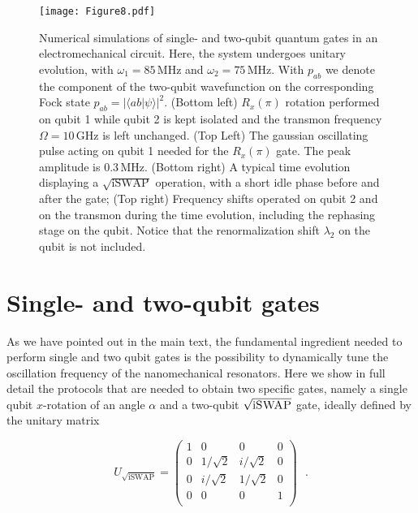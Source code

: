 \documentclass[aps,twocolumn,groupedaddress,superscriptaddress,floatfix,amsmath,amssymb,prb]{revtex4-1}
\begin{document}
\begin{figure*}[t]
\centering
\texttt{[image: Figure8.pdf]} 
\caption{Numerical simulations of single- and two-qubit quantum gates in an electromechanical circuit. Here, the system undergoes unitary evolution, with $\omega_1 = 85\,$MHz and $\omega_2 = 75\,$MHz. With $p_{ab}$ we denote the component of the two-qubit wavefunction on the corresponding Fock state $p_{ab}=\left|\langle ab|\psi\rangle\right|^2$. (Bottom left) $R_x(\pi)$ rotation performed on qubit 1 while qubit 2 is kept isolated and the transmon frequency $\Omega = 10\,$GHz is left unchanged. (Top Left) The gaussian oscillating pulse acting on qubit 1 needed for the $R_x(\pi)$ gate. The peak amplitude is $0.3\,$MHz. (Bottom right) A typical time evolution displaying a $\sqrt{\text{iSWAP}}$ operation, with a short idle phase before and after the gate; (Top right) Frequency shifts operated on qubit 2 and on the transmon during the time evolution, including the rephasing stage on the qubit. Notice that the renormalization shift $\lambda_2$ on the qubit is not included.}
\label{fig:Gates}
\end{figure*}


\section{Single- and two-qubit gates}
\label{app:Gates}

As we have pointed out in the main text, the fundamental ingredient needed to perform single and two qubit gates is the possibility to dynamically tune the oscillation frequency of the nanomechanical resonators. Here we show in full detail the protocols that are needed to obtain two specific gates, namely a single qubit $x$-rotation of an angle $\alpha$ and a two-qubit $\sqrt{\text{i\textsc{SWAP}}}$ gate, ideally defined by the unitary matrix

\begin{equation} \label{iswap_gate}
U_{\sqrt{\mathrm{iSWAP}}} = 
\left(\begin{array}{cccc} 1 & 0  &  0  &  0 \\ 
                                      0 & 1/\sqrt{2} & i/\sqrt{2}   & 0 \\  
                                      0 & i/\sqrt{2} & 1/\sqrt{2}   & 0 \\
                                      0 & 0 & 0   & 1 \\
                                      \end{array}\right) \,\,\,\, .
\end{equation}
\end{document}
